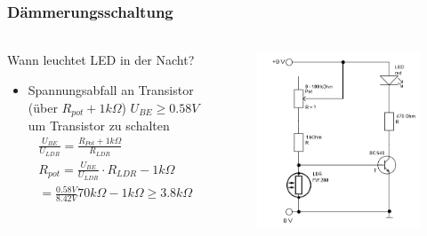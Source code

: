 \begin{frame}
    \frametitle{Dämmerungsschaltung}
    \framesubtitle{}
     \begin{columns}[c]
            \begin{block}{Wann leuchtet LED in der Nacht?}
                 \begin{itemize}
                     \item Spannungsabfall an Transistor (über $R_{pot} +
                     1k\Omega$) $U_{BE} \geq 0.58V$ um Transistor zu schalten
                     \begin{gather*}
                         \frac{U_{BE}}{U_{LDR}}=\frac{R_{Pot}+1k\Omega}{R_{LDR}} \\
                         R_{pot}
                         =
                         \frac{U_{BE}}{U_{LDR}} \cdot R_{LDR} - 1k\Omega \\
                         =
                         \frac{0.58V}{8.42V} 70k\Omega - 1k\Omega
                         \geq
                         3.8k\Omega
                     \end{gather*}
                 \end{itemize}
            \end{block}
             \begin{figure}[H]
             \begin{center}
                     \includegraphics[scale=0.4]{./img/schaltung/ldr_2.png}
             \end{center}
             \end{figure}
     \end{columns}
\end{frame}
